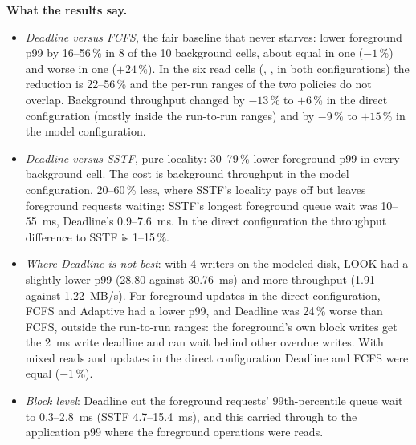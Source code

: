 \documentclass[12pt,a4paper]{article}
\DeclareRobustCommand{\code}[1]{\texttt{\detokenize{#1}}}
\begin{document}
\noindent\textbf{What the results say.}
\begin{itemize}[leftmargin=1.4em]
  \item \emph{Deadline versus FCFS}, the fair baseline that never starves: lower foreground p99 by 16--56\,\% in 8 of the 10 background cells, about equal in one ($-1$\,\%) and worse in one ($+24$\,\%). In the six read cells (\code{bg2_read}, \code{bg4_read}, \code{copy2_read} in both configurations) the reduction is 22--56\,\% and the per-run ranges of the two policies do not overlap. Background throughput changed by $-13$\,\% to $+6$\,\% in the direct configuration (mostly inside the run-to-run ranges) and by $-9$\,\% to $+15$\,\% in the model configuration.
  \item \emph{Deadline versus SSTF}, pure locality: 30--79\,\% lower foreground p99 in every background cell. The cost is background throughput in the model configuration, 20--60\,\% less, where SSTF's locality pays off but leaves foreground requests waiting: SSTF's longest foreground queue wait was 10--55~ms, Deadline's 0.9--7.6~ms. In the direct configuration the throughput difference to SSTF is 1--15\,\%.
  \item \emph{Where Deadline is not best}: with 4 writers on the modeled disk, LOOK had a slightly lower p99 (28.80 against 30.76~ms) and more throughput (1.91 against 1.22~MB/s). For foreground updates in the direct configuration, FCFS and Adaptive had a lower p99, and Deadline was 24\,\% worse than FCFS, outside the run-to-run ranges: the foreground's own block writes get the 2~ms write deadline and can wait behind other overdue writes. With mixed reads and updates in the direct configuration Deadline and FCFS were equal ($-1$\,\%).
  \item \emph{Block level}: Deadline cut the foreground requests' 99th-percentile queue wait to 0.3--2.8~ms (SSTF 4.7--15.4~ms), and this carried through to the application p99 where the foreground operations were reads.
\end{itemize}
\end{document}
